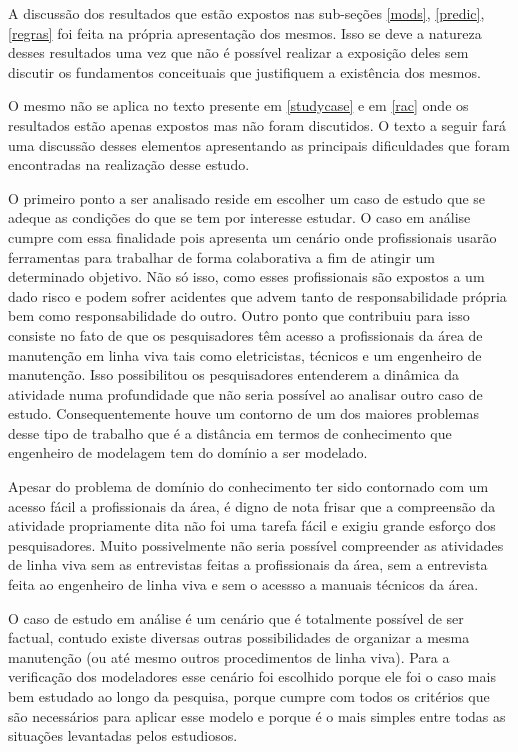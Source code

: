 A discussão dos resultados que estão expostos nas sub-seções \ref{mods}, \ref{predic}, \ref{regras} foi feita na própria apresentação dos mesmos. 
Isso se deve a natureza desses resultados uma vez que não é possível realizar a exposição deles sem discutir os fundamentos conceituais que 
justifiquem a existência dos mesmos. 

O mesmo não se aplica no texto presente em \ref{studycase} e em \ref{rac} onde os resultados estão apenas expostos mas não foram discutidos. O texto a seguir fará uma discussão desses elementos 
apresentando as principais dificuldades que foram encontradas na realização desse estudo. 

O primeiro ponto a ser analisado reside em escolher um caso de estudo que se adeque as condições do que se tem por interesse estudar. O caso em análise cumpre com essa finalidade pois 
apresenta um cenário onde profissionais usarão ferramentas para trabalhar de forma colaborativa a fim de atingir um determinado objetivo. Não só isso, como esses profissionais são 
expostos a um dado risco e podem sofrer acidentes que advem tanto de responsabilidade própria bem como responsabilidade do outro. Outro ponto que contribuiu para isso consiste no fato de que 
os pesquisadores têm acesso a profissionais da área de manutenção em linha viva tais como eletricistas, técnicos e um engenheiro de manutenção. Isso possibilitou os pesquisadores entenderem 
a dinâmica da atividade numa profundidade que não seria possível ao analisar outro caso de estudo. Consequentemente houve um contorno de um dos maiores problemas desse tipo de trabalho que é 
a distância em termos de conhecimento que engenheiro de modelagem tem do domínio a ser modelado. 

Apesar do problema de domínio do conhecimento ter sido contornado com um acesso fácil a profissionais da área, é digno de nota frisar que a compreensão da atividade propriamente dita não 
foi uma tarefa fácil e exigiu grande esforço dos pesquisadores. Muito possivelmente não seria possível compreender as atividades de linha viva sem as entrevistas feitas a profissionais da área, 
sem a entrevista feita ao engenheiro de linha viva e sem o acessso a manuais técnicos da área. 

O caso de estudo em análise é um cenário que é totalmente possível de ser factual, contudo existe diversas outras possibilidades de organizar a mesma manutenção (ou até mesmo outros 
procedimentos de linha viva). Para a verificação dos modeladores esse cenário foi escolhido porque ele foi o caso mais bem estudado ao longo da pesquisa, porque cumpre com todos os critérios  
que são necessários para aplicar esse modelo e porque é o mais simples entre todas as situações levantadas pelos estudiosos.


